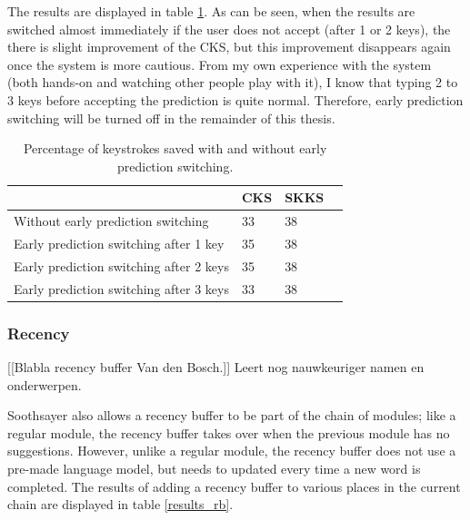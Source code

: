 \documentclass[12pt]{article}
\begin{document}
The results are displayed in table \ref{results_epd}. As can be seen, when the results are switched almost immediately if the user does not accept (after 1 or 2 keys), the there is slight improvement of the CKS, but this improvement disappears again once the system is more cautious. From my own experience with the system (both hands-on and watching other people play with it), I know that typing 2 to 3 keys before accepting the prediction is quite normal. Therefore, early prediction switching will be turned off in the remainder of this thesis.

\begin{table}[h]
\begin{tabular}{l|lll} 

&CKS&SKKS\\
\hline
Without early prediction switching&33&38\\
Early prediction switching after 1 key&35&38\\
Early prediction switching after 2 keys&35&38\\
Early prediction switching after 3 keys&33&38\\
\end{tabular} 
\caption{Percentage of keystrokes saved with and without early prediction switching.} \label{results_epd}
\end{table}


\subsubsection{Recency} \label{rb}

[[Blabla recency buffer Van den Bosch.]] Leert nog nauwkeuriger namen en onderwerpen.


Soothsayer also allows a recency buffer to be part of the chain of modules; like a regular module, the recency buffer takes over when the previous module has no suggestions. However, unlike a regular module, the recency buffer does not use a pre-made language model, but needs to updated every time a new word is completed. The results of adding a recency buffer to various places in the current chain are displayed in table \ref{results_rb}.
\end{document}
